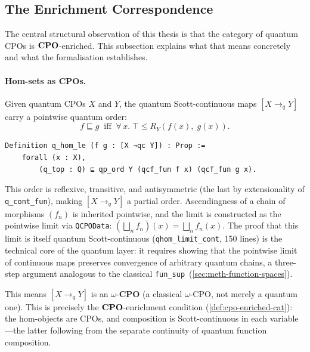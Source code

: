 \subsection{The Enrichment Correspondence}
\label{sec:disc-quantum-enrichment}

The central structural observation of this thesis is that the
category of quantum CPOs is $\mathbf{CPO}$-enriched.
This subsection explains what that means concretely and what the
formalisation establishes.

\paragraph{Hom-sets as CPOs.}
Given quantum CPOs $X$ and $Y$, the quantum Scott-continuous maps
$[X \to_q Y]$ carry a pointwise quantum order:
\[
  f \sqsubseteq g
  \;\;\text{iff}\;\;
  \forall\, x.\;
  \top \leq R_Y(f(x),\; g(x)).
\]

\begin{lstlisting}[caption={Pointwise ordering on quantum hom-sets
  (\texttt{qCPOProperties.v}).},
                    label={lst:qhomle}]
Definition q_hom_le (f g : [X →qc Y]) : Prop :=
    forall (x : X),
        (q_top : Q) ⊑ qp_ord Y (qcf_fun f x) (qcf_fun g x).
\end{lstlisting}

\noindent
This order is reflexive, transitive, and antisymmetric (the last by
extensionality of \texttt{q\_cont\_fun}), making
$[X \to_q Y]$ a partial order.
Ascendingness of a chain of morphisms $(f_n)$ is inherited
pointwise, and the limit is constructed as the pointwise limit via
\texttt{QCPOData}:
$(\bigsqcup_n f_n)(x) = \bigsqcup_n f_n(x)$.
The proof that this limit is itself quantum Scott-continuous
(\texttt{qhom\_limit\_cont}, 150 lines) is the technical core of
the quantum layer: it requires showing that the pointwise limit of
continuous maps preserves convergence of arbitrary quantum chains, a
three-step argument analogous to the classical
\texttt{fun\_sup}~(\cref{sec:meth-function-spaces}).

This means $[X \to_q Y]$ is an $\omega$-\textbf{CPO} (a classical
$\omega$-CPO, not merely a quantum one).
This is precisely the $\mathbf{CPO}$-enrichment condition
(\cref{def:cpo-enriched-cat}): the hom-objects are CPOs, and
composition is Scott-continuous in each variable---the latter
following from the separate continuity of quantum function
composition.

